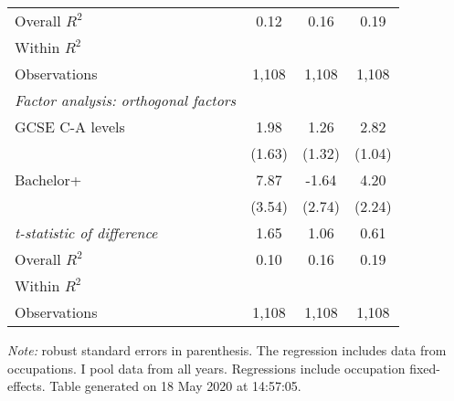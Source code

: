 \begin{center}
\begin{threeparttable}[!h]
\begin{tabular}{lccc}
\midrule Overall $ R^2$&        0.12         &        0.16         &        0.19         \\
Within $ R^2$       &                     &                     &                     \\
Observations        &       1,108         &       1,108         &       1,108         \\
\midrule \vspace{1mm}\textit{Factor analysis: orthogonal factors} \\ 
\hspace{3mm}GCSE C-A levels&        1.98         &        1.26         &        2.82\sym{**} \\
                    &      (1.63)         &      (1.32)         &      (1.04)         \\
\hspace{3mm}Bachelor+&        7.87\sym{*}  &       -1.64         &        4.20         \\
                    &      (3.54)         &      (2.74)         &      (2.24)         \\
\textit{t-statistic of difference}&        1.65         &        1.06         &        0.61         \\
\midrule Overall $ R^2$&        0.10         &        0.16         &        0.19         \\
Within $ R^2$       &                     &                     &                     \\
Observations        &       1,108         &       1,108         &       1,108         \\
\bottomrule
\bottomrule
\end{tabular}
\begin{tablenotes}
\item \footnotesize \textit{Note:} robust standard errors in parenthesis. The regression includes data from occupations. I pool data from all years. Regressions include occupation fixed-effects. Table generated on 18 May 2020 at 14:57:05.
\end{tablenotes}
\end{threeparttable}
\end{center}
